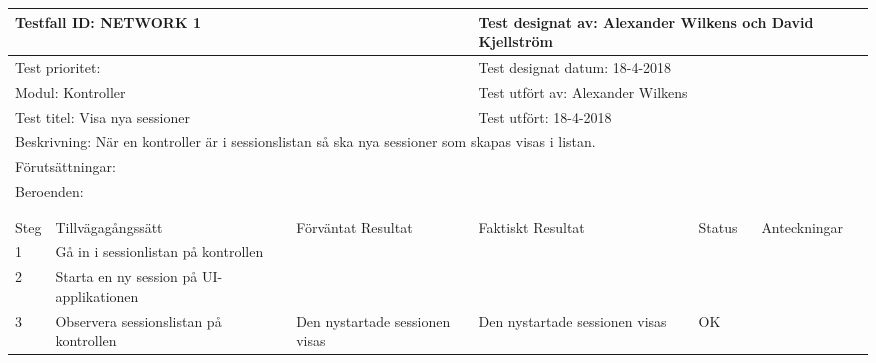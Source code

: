 \documentclass[10pt]{article}
\begin{document}
\begin{tabular}{| p{1cm}|  p{3cm} | p{3cm}| p{3cm}| p{2cm}| p{3cm}|}
	\hline
	  \multicolumn{3}{|l|}{Testfall ID: NETWORK 1}&\multicolumn{3}{|l|}{Test designat av: Alexander Wilkens och David Kjellström}\\
	  \hline
	  \multicolumn{3}{|l|}{Test prioritet:}&\multicolumn{3}{|l|}{Test designat datum: 18-4-2018}\\
	  \hline
	  \multicolumn{3}{|l|}{Modul: Kontroller}&\multicolumn{3}{|l|}{Test utfört av: Alexander Wilkens}\\
	  \hline
	  \multicolumn{3}{|l|}{Test titel: Visa nya sessioner}&\multicolumn{3}{|l|}{Test utfört: 18-4-2018}\\
	  \hline
	  \multicolumn{6}{|p{\textwidth}|}{Beskrivning: När en kontroller är i sessionslistan så ska nya sessioner som skapas visas i listan.}\\
	  \hline
	  \multicolumn{6}{|p{\textwidth}|}{Förutsättningar:}\\
	  \hline
	  \multicolumn{6}{|p{\textwidth}|}{Beroenden:}\\
  
	\hline
	\multicolumn{6}{|l|}{}\\
	\multicolumn{6}{|l|}{}\\
      	\hline
	Steg&Tillvägagångssätt&Förväntat Resultat&Faktiskt Resultat&Status&Anteckningar \\
	\hline
	1&Gå in i sessionlistan på kontrollen&&&&\\
      	\hline
	2&Starta en ny session på UI-applikationen&&&&\\
      	\hline
	3&Observera sessionslistan på kontrollen&Den nystartade sessionen visas&Den nystartade sessionen visas&OK&\\
      	\hline
\end{tabular}
\end{document}
